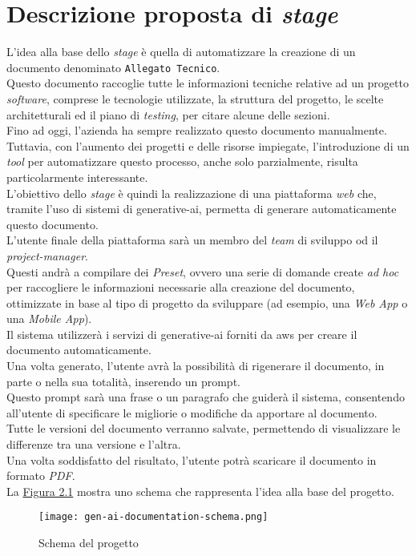\section{Descrizione proposta di \textit{stage}}
\label{sez:descrizione-stage}

L'idea alla base dello \textit{stage} è quella di automatizzare la creazione di un documento denominato \texttt{Allegato Tecnico}.\\  
Questo documento raccoglie tutte le informazioni tecniche relative ad un progetto \textit{software}, comprese le tecnologie utilizzate,
la struttura del progetto, le scelte architetturali ed il piano di \textit{testing}, per citare alcune delle sezioni.\\  
Fino ad oggi, l'azienda ha sempre realizzato questo documento manualmente.\\
Tuttavia, con l'aumento dei progetti e delle risorse impiegate,
l'introduzione di un \textit{tool} per automatizzare questo processo, anche solo parzialmente, risulta particolarmente interessante.\\  

\pagebreak
\noindent L'obiettivo dello \textit{stage} è quindi la realizzazione di una piattaforma \textit{web} che, tramite l'uso di sistemi di \gls{generative-ai},  
permetta di generare automaticamente questo documento.\\  
L'utente finale della piattaforma sarà un membro del \textit{team} di sviluppo od il \textit{project-manager}.\\  
Questi andrà a compilare dei \textit{Preset}, ovvero una serie di domande create \textit{ad hoc}
per raccogliere le informazioni necessarie alla creazione del documento, ottimizzate in base al tipo di progetto da sviluppare (ad esempio, una \textit{Web App} o una \textit{Mobile App}).\\  
Il sistema utilizzerà i servizi di \gls{generative-ai} forniti da \gls{aws} per creare il documento automaticamente.\\  

\noindent Una volta generato, l'utente avrà la possibilità di rigenerare il documento, in parte o nella sua totalità, inserendo un \gls{prompt}.\\  
Questo \gls{prompt} sarà una frase o un paragrafo che guiderà il sistema, consentendo all'utente di specificare le migliorie o modifiche da apportare al documento.\\  
Tutte le versioni del documento verranno salvate, permettendo di visualizzare le differenze tra una versione e l'altra.\\  
Una volta soddisfatto del risultato, l'utente potrà scaricare il documento in formato \textit{PDF}.\\  
La {\hyperref[fig:project-schema]{Figura 2.1}} mostra uno schema che rappresenta l'idea alla base del progetto.\\  


\begin{figure}[H]
    \label{fig:project-schema}
    \centering
    \texttt{[image: gen-ai-documentation-schema.png]}
    \caption{Schema del progetto}
\end{figure}